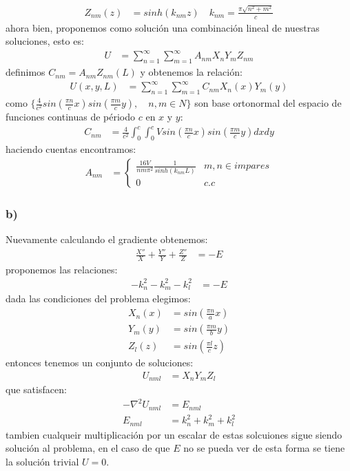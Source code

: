 \documentclass{article}
\begin{document}
\begin{tcolorbox}[breakable]
\begin{align*}
        Z_{nm}(z) &= sinh(k_{nm}z)
        \quad k_{nm} = \frac{\pi \sqrt{ n^2 + m^2 }}{c} 
    \end{align*}
    ahora bien, proponemos como solución una combinación lineal de nuestras soluciones, esto es:
    \begin{align*}
        U 
        &=\sum_{n=1}^\infty \sum_{m=1}^\infty A_{nm}X_nY_mZ_{nm}
    \end{align*}
    definimos $C_{nm} = A_{nm}Z_{nm}(L)$ y obtenemos la relación:
    \begin{align*}
        U(x,y,L) 
        &=\sum_{n=1}^\infty \sum_{m=1}^\infty C_{nm}X_n(x)Y_m(y)
    \end{align*}
    como $\{\frac{4}{c^2}sin(\frac{\pi n}{c}x)sin(\frac{\pi m}{c}y),\quad n,m \in N\}$ son base ortonormal del espacio 
    de funciones continuas de périodo $c$ en $x$ y $y$:
    \begin{align*}
        C_{nm} &= \frac{4}{c^2} \int_0^c\int_0^c Vsin\left(\frac{\pi n}{c}x\right)sin\left(\frac{\pi m}{c}y\right)dxdy
    \end{align*}
    haciendo cuentas encontramos:
    \begin{align*}
        A_{nm} &= 
        \begin{cases}
        \frac{16V}{nm\pi^2}\frac{1}{sinh(k_{nm}L)} & m,n \in impares \\
        0 &c.c    
        \end{cases}
    \end{align*}
    \subsubsection*{b)}
    Nuevamente calculando el gradiente obtenemos:
    \begin{align*}
        \frac{X''}{X} + \frac{Y''}{Y} + \frac{Z''}{Z} &= -E
    \end{align*}
    proponemos las relaciones:
    \begin{align*}
        -k_n^2 -k_m^2 -k_{l}^2 &= -E
    \end{align*} 
    dada las condiciones del problema elegimos:
    \begin{align*}
        X_n(x) &= sin\left( \frac{\pi n}{a} x\right) \\
        Y_m(y) &= sin\left( \frac{\pi m}{b} y\right) \\
        Z_{l}(z) &= sin\left( \frac{\pi l}{c} z\right)
    \end{align*}
    entonces tenemos un conjunto de soluciones:
    \begin{align*}
        U_{nml} &= X_nY_mZ_l 
    \end{align*}
    que satisfacen:
    \begin{align*}
        -\nabla^2 U_{nml} &= E_{nml} \\ 
        E_{nml} &= k_n^2+k_m^2+k_l^2 
    \end{align*}
    tambien cualqueir multiplicación por un escalar de estas solcuiones sigue siendo 
    solución al problema, en el caso de que $E$ no se pueda ver de esta forma se tiene
    la solución trivial $U=0$.
\end{tcolorbox}
\end{document}

